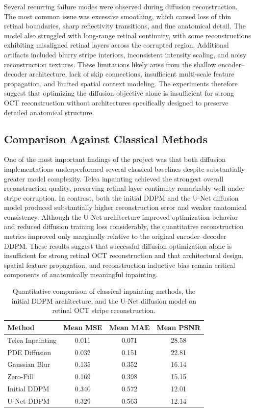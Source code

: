 \documentclass[12pt,oneside]{article}
\begin{document}
Several recurring failure modes were observed during diffusion reconstruction. The most common issue was excessive smoothing, which caused loss of thin retinal boundaries, sharp reflectivity transitions, and fine anatomical detail. The model also struggled with long-range retinal continuity, with some reconstructions exhibiting misaligned retinal layers across the corrupted region. Additional artifacts included blurry stripe interiors, inconsistent intensity scaling, and noisy reconstruction textures. These limitations likely arise from the shallow encoder--decoder architecture, lack of skip connections, insufficient multi-scale feature propagation, and limited spatial context modeling. The experiments therefore suggest that optimizing the diffusion objective alone is insufficient for strong OCT reconstruction without architectures specifically designed to preserve detailed anatomical structure.
\subsection*{Comparison Against Classical Methods}

One of the most important findings of the project was that both diffusion implementations underperformed several classical baselines despite substantially greater model complexity. Telea inpainting achieved the strongest overall reconstruction quality, preserving retinal layer continuity remarkably well under stripe corruption. In contrast, both the initial DDPM and the U-Net diffusion model produced substantially higher reconstruction error and weaker anatomical consistency. Although the U-Net architecture improved optimization behavior and reduced diffusion training loss considerably, the quantitative reconstruction metrics improved only marginally relative to the original encoder--decoder DDPM. These results suggest that successful diffusion optimization alone is insufficient for strong retinal OCT reconstruction and that architectural design, spatial feature propagation, and reconstruction inductive bias remain critical components of anatomically meaningful inpainting.

\begin{table}[H]
\centering
\begin{tabular}{lccc}
\toprule
Method & Mean MSE & Mean MAE & Mean PSNR \\
\midrule
Telea Inpainting & 0.011 & 0.071 & 28.58 \\
PDE Diffusion & 0.032 & 0.151 & 22.81 \\
Gaussian Blur & 0.135 & 0.352 & 16.14 \\
Zero-Fill & 0.169 & 0.398 & 15.15 \\
Initial DDPM & 0.340 & 0.572 & 12.01 \\
U-Net DDPM & 0.329 & 0.563 & 12.14 \\
\bottomrule
\end{tabular}
\caption{Quantitative comparison of classical inpainting methods, the initial DDPM architecture, and the U-Net diffusion model on retinal OCT stripe reconstruction.}
\end{table}
\end{document}
